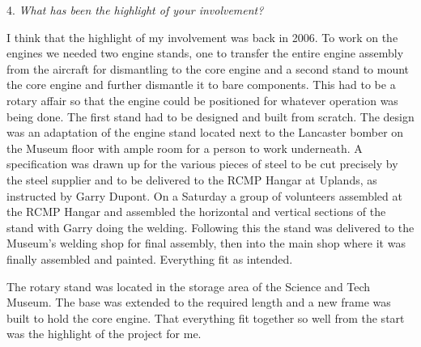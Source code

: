 \begin{multicols}{2}


4. \textit{What has been the highlight of your involvement?}

I think that the highlight of my involvement was back in 2006. To work on the
engines we needed two engine stands, one to transfer the entire engine assembly
from the aircraft for dismantling to the core engine and a second stand to
mount the core engine and further dismantle it to bare components. This had to
be a rotary affair so that the engine could be positioned for whatever
operation was being done. The first stand had to be designed and built from
scratch. The design was an adaptation of the engine stand located next to the
Lancaster bomber on the Museum floor with ample room for a person to work
underneath. A specification was drawn up for the various pieces of steel to be
cut precisely by the steel supplier and to be delivered to the RCMP Hangar at
Uplands, as instructed by Garry Dupont. On a Saturday a group of volunteers
assembled at the RCMP Hangar and assembled the horizontal and vertical sections
of the stand with Garry doing the welding. Following this the stand was
delivered to the Museum's welding shop for final assembly, then into the main
shop where it was finally assembled and painted. Everything fit as intended.

The rotary stand was located in the storage area of the Science and Tech
Museum. The base was extended to the required length and a new frame was built
to hold the core engine. That everything fit together so well from the start
was the highlight of the project for me.


\end{multicols}
